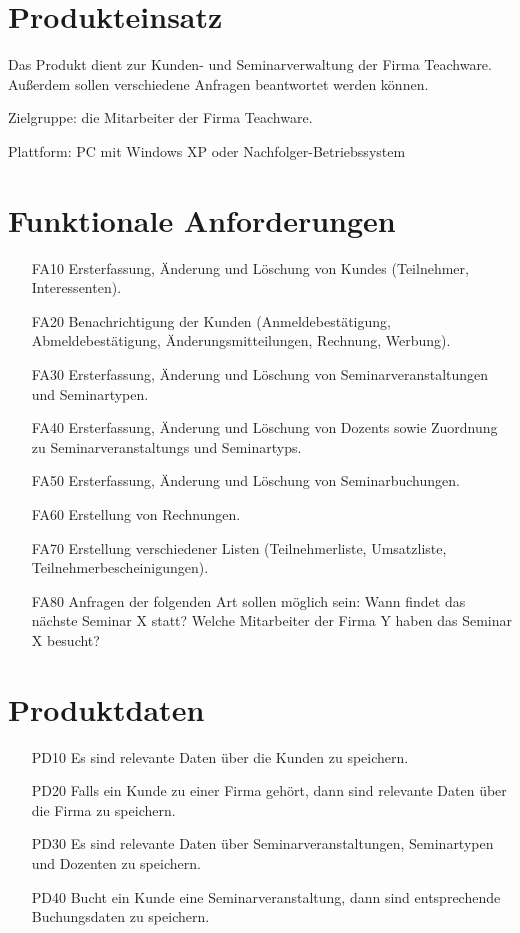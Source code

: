 \documentclass[parskip=full]{scrartcl}
\begin{document}
\section{Produkteinsatz}
Das Produkt dient zur Kunden- und Seminarverwaltung der Firma Teachware. Außerdem sollen verschiedene Anfragen beantwortet werden können.

Zielgruppe: die Mitarbeiter der Firma Teachware.

Plattform: PC mit Windows XP oder Nachfolger-Betriebssystem

\section{Funktionale Anforderungen}
\begin{itemize}[nosep]
\item[FA10] Ersterfassung, Änderung und Löschung von \glspl{Kunde} (Teilnehmer, Interessenten).
\item[FA20] Benachrichtigung der Kunden (Anmeldebestätigung, Abmeldebestätigung, Änderungsmitteilungen, Rechnung, Werbung).
\item[FA30] Ersterfassung, Änderung und Löschung von Seminarveranstaltungen und Seminartypen.
\item[FA40] Ersterfassung, Änderung und Löschung von \glspl{Dozent} sowie Zuordnung zu \glspl{Seminarveranstaltung} und \glspl{Seminartyp}.
\item[FA50] Ersterfassung, Änderung und Löschung von Seminarbuchungen.
\item[FA60] Erstellung von Rechnungen.
\item[FA70] Erstellung verschiedener Listen (Teilnehmerliste, Umsatzliste, Teilnehmerbescheinigungen).
\item[FA80] Anfragen der folgenden Art sollen möglich sein:
     Wann findet das nächste Seminar X statt? Welche Mitarbeiter der Firma Y haben das Seminar X besucht?
\end{itemize}

\section{Produktdaten}
\begin{itemize}[nosep]
\item[PD10] Es sind relevante Daten über die Kunden zu speichern.
\item[PD20] Falls ein Kunde zu einer Firma gehört, dann sind relevante Daten über die Firma zu speichern.
\item[PD30] Es sind relevante Daten über Seminarveranstaltungen, Seminartypen und Dozenten zu speichern.
\item[PD40] Bucht ein Kunde eine Seminarveranstaltung, dann sind entsprechende Buchungsdaten zu speichern.
\end{itemize}
\end{document}
